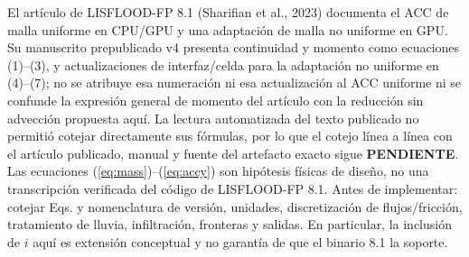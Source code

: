 \documentclass[11pt,a4paper]{article}
\newcommand{\pend}{\textbf{PENDIENTE}}
\begin{document}
El artículo de LISFLOOD-FP 8.1 (Sharifian et al., 2023) documenta el ACC de malla uniforme en CPU/GPU y una adaptación de malla no uniforme en GPU. Su manuscrito prepublicado v4 presenta continuidad y momento como ecuaciones (1)--(3), y actualizaciones de interfaz/celda para la adaptación no uniforme en (4)--(7); no se atribuye esa numeración ni esa actualización al ACC uniforme ni se confunde la expresión general de momento del artículo con la reducción sin advección propuesta aquí. La lectura automatizada del texto publicado no permitió cotejar directamente sus fórmulas, por lo que el cotejo línea a línea con el artículo publicado, manual y fuente del artefacto exacto sigue \pend. Las ecuaciones (\ref{eq:mass})--(\ref{eq:accy}) son hipótesis físicas de diseño, no una transcripción verificada del código de LISFLOOD-FP 8.1. Antes de implementar: cotejar Eqs. y nomenclatura de versión, unidades, discretización de flujos/fricción, tratamiento de lluvia, infiltración, fronteras y salidas. En particular, la inclusión de $i$ aquí es extensión conceptual y no garantía de que el binario 8.1 la soporte.
\end{document}
